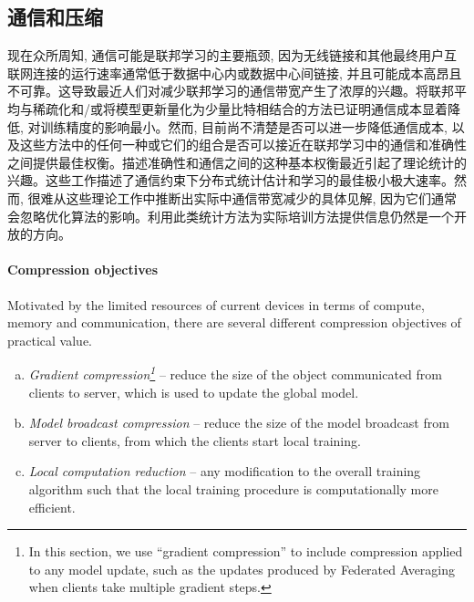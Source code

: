\subsection*{通信和压缩}

现在众所周知, 通信可能是联邦学习的主要瓶颈, 因为无线链接和其他最终用户互联网连接的运行速率通常低于数据中心内或数据中心间链接, 并且可能成本高昂且不可靠。这导致最近人们对减少联邦学习的通信带宽产生了浓厚的兴趣。将联邦平均与稀疏化和/或将模型更新量化为少量比特相结合的方法已证明通信成本显着降低, 对训练精度的影响最小\citep{konevcny2016federated}。然而, 目前尚不清楚是否可以进一步降低通信成本, 以及这些方法中的任何一种或它们的组合是否可以接近在联邦学习中的通信和准确性之间提供最佳权衡。描述准确性和通信之间的这种基本权衡最近引起了理论统计\citep{duchi2013,braverman2016,han2018,acharya2018,barnes2019,tang2019texttt,Barnes2020rtopk}的兴趣。这些工作描述了通信约束下分布式统计估计和学习的最佳极小极大速率。然而, 很难从这些理论工作中推断出实际中通信带宽减少的具体见解, 因为它们通常会忽略优化算法的影响。利用此类统计方法为实际培训方法提供信息仍然是一个开放的方向。

\paragraph{Compression objectives} Motivated by the limited resources of current devices in terms of compute, memory and communication, there are several different compression objectives of practical value.
\begin{enumerate}[(a)]
    \item \emph{Gradient compression\footnote{In this section, we use ``gradient compression'' to include compression applied to any model update, such as the updates produced by Federated Averaging when clients take multiple gradient steps.}} -- reduce the size of the object communicated from clients to server, which is used to update the global model.
    \item \emph{Model broadcast compression} -- reduce the size of the model broadcast from server to clients, from which the clients start local training.
    \item \emph{Local computation reduction} -- any modification to the overall training algorithm such that the local training procedure is computationally more efficient.
\end{enumerate}


